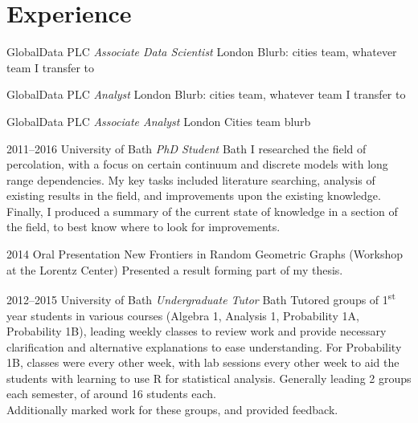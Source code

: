 \documentclass[print, oneside]{friggeri-cv} %
\begin{document}
\section{Experience}


\begin{entrylist}

{GlobalData PLC {\normalfont \emph{Associate Data Scientist}}}
{London}
{Blurb: cities team, whatever team I transfer to}

{GlobalData PLC {\normalfont \emph{Analyst}}}
{London}
{Blurb: cities team, whatever team I transfer to}

{GlobalData PLC {\normalfont \emph{Associate Analyst}}}
{London}
{Cities team blurb}


\entry
{2011--2016}
{University of Bath {\normalfont \emph{PhD Student}}}
{Bath}
{I researched the field of percolation, with a focus on certain continuum and discrete models with long range dependencies. My key tasks included literature searching, analysis of existing results in the field, and improvements upon the existing knowledge. Finally, I produced a summary of the current state of knowledge in a section of the field, to best know where to look for improvements.}

\entry
{2014}
{Oral Presentation}
{New Frontiers in Random Geometric Graphs (Workshop at the Lorentz Center)}
{Presented a result forming part of my thesis.}




\entry
{2012--2015}
{University of Bath {\normalfont \emph{Undergraduate Tutor}}}
{Bath}
{Tutored groups of 1\textsuperscript{st} year students in various courses (Algebra 1, Analysis 1, Probability 1A, Probability 1B), leading weekly classes to review work and provide necessary clarification and alternative explanations to ease understanding. For Probability 1B, classes were every other week, with lab sessions every other week to aid the students with learning to use R for statistical analysis. Generally leading 2 groups each semester, of around 16 students each.\\
Additionally marked work for these groups, and provided feedback.}


\end{entrylist}
\end{document}
